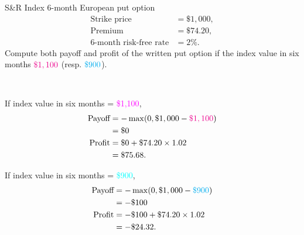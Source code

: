 \begin{frame}[fragile,t]
	\begin{myexample}
		 S\&R Index 6-month European put option
		 \begin{align*}
			 \text{Strike price}           & = \$1,000, \\
			 \text{Premium}                & = \$74.20, \\
			 \text{6-month risk-free rate} & = 2\%.
		 \end{align*}
		 Compute both payoff and profit of the \textcolor{alert}{written} put option if the index
		 value in six months $\textcolor{magenta}{\$1,100}$ (resp.  $\textcolor{cyan}{\$900}$).
	\end{myexample}
	\bigskip
	\pause
	\begin{mysol}\phantom{a}\\[1em]

	 \begin{minipage}{0.48\textwidth}
		\begin{center}
			If index value in six months = \textcolor{magenta}{\$1,100},
			\begin{align*}
				\text{Payoff} & = - \max ( 0, \$1,000 - \textcolor{magenta}{\$1,100}) \\
                      & = \$0                                                 \\
				\text{Profit} & = \$0 + \$74.20 \times 1.02                           \\
                      & = \$75.68.
			\end{align*}
		\end{center}
	 \end{minipage}
	 \hfill \pause
	 \begin{minipage}{0.48\textwidth}
		\begin{center}
			If index value in six months = \textcolor{cyan}{\$900},
			\begin{align*}
				\text{Payoff} & = - \max ( 0, \$1,000 - \textcolor{cyan}{\$900} ) \\
                      & = - \$100                                         \\
				\text{Profit} & = - \$100 + \$74.20 \times 1.02                   \\
                      & = - \$24.32.
			\end{align*}
		\end{center}
	 \end{minipage}

	 \myEnd
	\end{mysol}
\end{frame}
